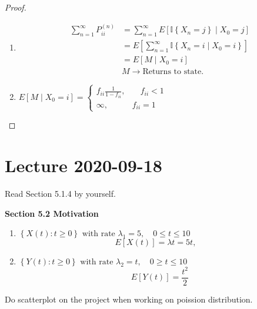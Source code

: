 \documentclass{article}
\theoremstyle{remark}
\begin{document}
 \begin{proof}
   \begin{enumerate}[label=(\roman*)]
     \item  \[
         \begin{split}
\sum_{n =1}^{\infty}  P _{ii}^{(n)}  & = \sum_{n= 1}^{\infty}  E\left[ \mathbb{I} \left\{ X_{n} = j \right\}  \mid  X_{0} = j \right]  \\
       & = E\left[ \sum_{n=1}^{ \infty}  \mathbb{I} \left\{ X_{n} = i  \mid  X_{0} = i \right\} \right] \\
       &= E\left[ M  \mid  X_{0} = i \right] \\
        & M \to  \text{Returns to state.}
         \end{split}
     \]
   \item $E \left[ M  \mid  X_{0} = i \right] = \begin{cases}
     f_{ii}\frac{1}{1- f_{ii}}  , &  \quad  f_{ii} < 1 \\
     \infty ,  &  f_{ii} = 1
   \end{cases}$
   \end{enumerate}
 \end{proof}

 \newpage
 \section{Lecture 2020-09-18}%
 \label{sec:lecture_2020_09_18}

 \begin{tcolorbox}
   Read Section 5.1.4 by yourself.
 \end{tcolorbox}

\textbf{Section 5.2 Motivation}

\begin{enumerate}[label=(\alph*)]
  \item $\left\{ X\left( t \right): t \ge 0 \right\} \text{ with rate } \lambda _{1} = 5, \quad  0 \le t \le 10 $
    \[
    E\left[ X\left( t \right) \right] = \lambda t = 5t, \quad
    \]
  \item $\left\{ Y\left( t \right): t \ge 0 \right\} \text{ with rate } \lambda _{2} = t, \quad  0\ge t \le 10 $\[
      E \left[ Y\left( t \right) \right] = \frac{t^2}{2}
  \]
\end{enumerate}

\begin{tcolorbox}
  Do scatterplot on the project when working on poission distribution.
\end{tcolorbox}
\end{document}
